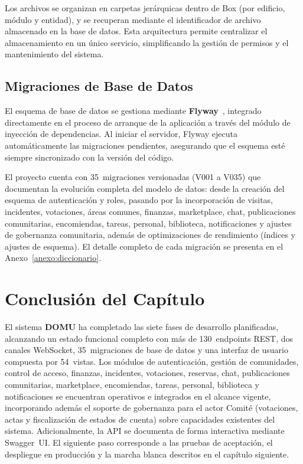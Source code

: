 Los archivos se organizan en carpetas jerárquicas dentro de Box (por edificio, módulo y entidad), y se recuperan mediante el identificador de archivo almacenado en la base de datos. Esta arquitectura permite centralizar el almacenamiento en un único servicio, simplificando la gestión de permisos y el mantenimiento del sistema.

\subsection{Migraciones de Base de Datos}
El esquema de base de datos se gestiona mediante \textbf{Flyway}~\cite{flyway2025}, integrado directamente en el proceso de arranque de la aplicación a través del módulo de inyección de dependencias. Al iniciar el servidor, Flyway ejecuta automáticamente las migraciones pendientes, asegurando que el esquema esté siempre sincronizado con la versión del código.

El proyecto cuenta con 35~migraciones versionadas (V001 a V035) que documentan la evolución completa del modelo de datos: desde la creación del esquema de autenticación y roles, pasando por la incorporación de visitas, incidentes, votaciones, áreas comunes, finanzas, marketplace, chat, publicaciones comunitarias, encomiendas, tareas, personal, biblioteca, notificaciones y ajustes de gobernanza comunitaria, además de optimizaciones de rendimiento (índices y ajustes de esquema). El detalle completo de cada migración se presenta en el Anexo~\ref{anexo:diccionario}.

\section{Conclusión del Capítulo}
El sistema \textbf{DOMU} ha completado las siete fases de desarrollo planificadas, alcanzando un estado funcional completo con más de 130~endpoints REST, dos canales WebSocket, 35~migraciones de base de datos y una interfaz de usuario compuesta por 54~vistas. Los módulos de autenticación, gestión de comunidades, control de acceso, finanzas, incidentes, votaciones, reservas, chat, publicaciones comunitarias, marketplace, encomiendas, tareas, personal, biblioteca y notificaciones se encuentran operativos e integrados en el alcance vigente, incorporando además el soporte de gobernanza para el actor Comité (votaciones, actas y fiscalización de estados de cuenta) sobre capacidades existentes del sistema. Adicionalmente, la API se documenta de forma interactiva mediante Swagger~UI. El siguiente paso corresponde a las pruebas de aceptación, el despliegue en producción y la marcha blanca descritos en el capítulo siguiente.
